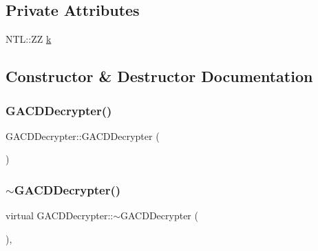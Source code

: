 \subsection*{Private Attributes}
\begin{DoxyCompactItemize}
\item 
N\+T\+L\+::\+ZZ \hyperlink{classGACDDecrypter_add375694b9dd663ac42f6244f4d8ea53}{k}
\end{DoxyCompactItemize}


\subsection{Constructor \& Destructor Documentation}
\mbox{\label{classGACDDecrypter_a3ce2ad60f6e2a6bb5e474df80e65a61d}} 
\subsubsection{\texorpdfstring{G\+A\+C\+D\+Decrypter()}{GACDDecrypter()}}
{\footnotesize\ttfamily G\+A\+C\+D\+Decrypter\+::\+G\+A\+C\+D\+Decrypter (\begin{DoxyParamCaption}{ }\end{DoxyParamCaption})\hspace{0.3cm}{\ttfamily [inline]}}

\mbox{\label{classGACDDecrypter_a9f940e67f5747fe8052de483531ebfbf}} 
\subsubsection{\texorpdfstring{$\sim$\+G\+A\+C\+D\+Decrypter()}{~GACDDecrypter()}}
{\footnotesize\ttfamily virtual G\+A\+C\+D\+Decrypter\+::$\sim$\+G\+A\+C\+D\+Decrypter (\begin{DoxyParamCaption}{ }\end{DoxyParamCaption})\hspace{0.3cm}{\ttfamily [inline]}, {\ttfamily [virtual]}}




